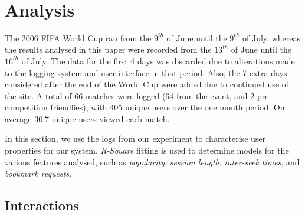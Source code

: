 \documentclass[letterpaper,nocopyrightspace]{sig-alternate}
\newcommand{\capttext}{\protect\centering\em}
\begin{document}
~\\

\section{Analysis}
\label{sect:results}

The 2006 FIFA World Cup ran from the $9^{th}$ of June until the
$9^{th}$ of July, whereas the results analysed in this paper were
recorded from the $13^{th}$ of June until the $16^{th}$ of July. The
data for the first 4 days was discarded due to alterations made to
the logging system and user interface in that period. Also, the 7
extra days considered after the end of the World Cup were added due
to continued use of the site. A total of 66 matches were logged (64
from the event, and 2 pre-competition friendlies), with 405 unique
users over the one month period. On average 30.7 unique users viewed
each match.

In this section, we use the logs from our experiment to characterise
user properties for our system. {\em R-Square} fitting is used to
determine models for the various features analysed, such as
\emph{popularity}, \emph{session length}, \emph{inter-seek times},
and \emph{bookmark requests}.

\subsection{Interactions}
\label{sect:interactions}

\begin{table}[tb]
 \caption{\capttext Number of occurrences of interactive actions}
\label{tab:number_of_actions}
\end{table}
\end{document}
